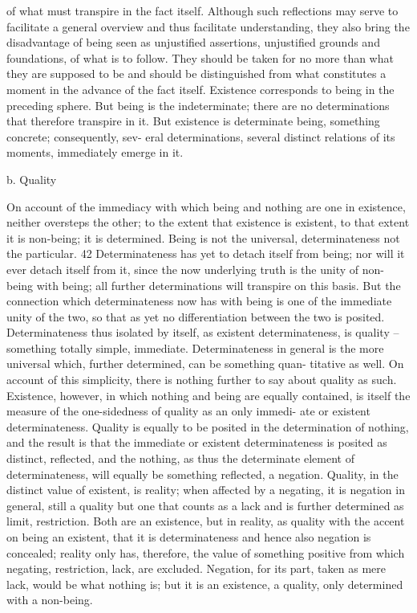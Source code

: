 of what must transpire in the fact itself. Although such reflections may
serve to facilitate a general overview and thus facilitate understanding,
they also bring the disadvantage of being seen as unjustified assertions,
unjustified grounds and foundations, of what is to follow. They should
be taken for no more than what they are supposed to be and should be
distinguished from what constitutes a moment in the advance of the fact
itself.
Existence corresponds to being in the preceding sphere. But being is the
indeterminate; there are no determinations that therefore transpire in it.
But existence is determinate being, something concrete; consequently, sev-
eral determinations, several distinct relations of its moments, immediately
emerge in it.

b. Quality

On account of the immediacy with which being and nothing are one in
existence, neither oversteps the other; to the extent that existence is existent,
to that extent it is non-being; it is determined. Being is not the universal,
determinateness not the particular. 42 Determinateness has yet to detach itself
from being; nor will it ever detach itself from it, since the now underlying
truth is the unity of non-being with being; all further determinations will
transpire on this basis. But the connection which determinateness now has
with being is one of the immediate unity of the two, so that as yet no
differentiation between the two is posited.
Determinateness thus isolated by itself, as existent determinateness, is
quality – something totally simple, immediate. Determinateness in general
is the more universal which, further determined, can be something quan-
titative as well. On account of this simplicity, there is nothing further to
say about quality as such.
Existence, however, in which nothing and being are equally contained,
is itself the measure of the one-sidedness of quality as an only immedi-
ate or existent determinateness. Quality is equally to be posited in the
determination of nothing, and the result is that the immediate or existent
determinateness is posited as distinct, reflected, and the nothing, as thus
the determinate element of determinateness, will equally be something
reflected, a negation. Quality, in the distinct value of existent, is reality;
when affected by a negating, it is negation in general, still a quality but one
that counts as a lack and is further determined as limit, restriction.
Both are an existence, but in reality, as quality with the accent on being
an existent, that it is determinateness and hence also negation is concealed;
reality only has, therefore, the value of something positive from which
negating, restriction, lack, are excluded. Negation, for its part, taken as
mere lack, would be what nothing is; but it is an existence, a quality, only
determined with a non-being.

